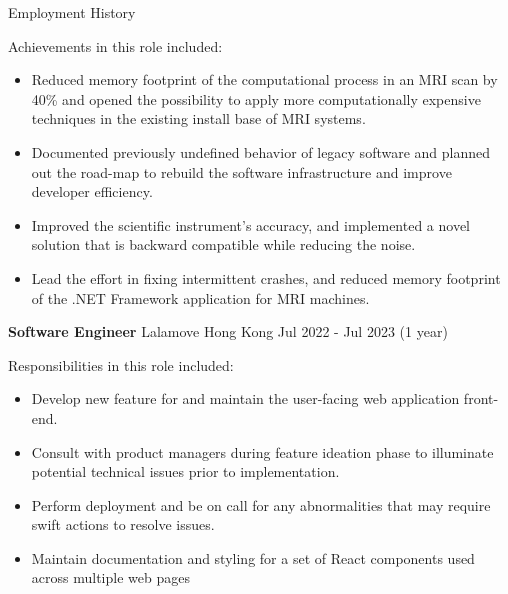 \documentclass{resume} %
\begin{document}
\begin{rSection}{Employment History}
\begin{minipage}{.8\textwidth}
        Achievements in this role included:
        \begin{itemize}
            \item Reduced memory footprint of the computational process in an MRI scan by 40\% and opened the possibility to apply more computationally expensive techniques in the existing install base of MRI systems.
            \item Documented previously undefined behavior of legacy software and planned out the road-map to rebuild the software infrastructure and improve developer efficiency.
            \item Improved the scientific instrument's accuracy, and implemented a novel solution that is backward compatible while reducing the noise.
            \item Lead the effort in fixing intermittent crashes, and reduced memory footprint of the .NET Framework application for MRI machines.
        \end{itemize}
    \end{minipage}%
    
    \clearpage

    \item \textbf{Software Engineer} {Lalamove Hong Kong} \hfill Jul 2022 - Jul 2023 (1 year)\\ 
    
    \hspace*{1cm}%
    \begin{minipage}{.8\textwidth}%
        
        Responsibilities in this role included:
        \begin{itemize}
            \item Develop new feature for and maintain the user-facing web application front-end.
            \item Consult with product managers during feature ideation phase to illuminate potential technical issues prior to implementation.
            \item Perform deployment and be on call for any abnormalities that may require swift actions to resolve issues.
            \item Maintain documentation and styling for a set of React components used across multiple web pages
        \end{itemize}
        

\end{minipage}
\end{rSection}
\end{document}
